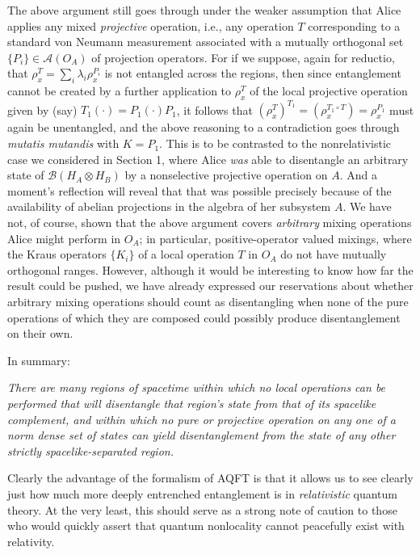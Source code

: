 \documentclass[12pt]{article}
\newcommand{\alg}[1]{\mbox{$\mathcal{#1}$}}
\begin{document}
       The above argument still goes through under the weaker assumption that 
       Alice applies any mixed \emph{projective} operation, i.e., any 
       operation $T$ corresponding to a standard von Neumann 
       measurement associated with a mutually orthogonal set 
       $\{P_{i}\}\in\alg{A}(O_{A})$ of projection operators.  For if we 
        suppose, again for reductio,
        that $\rho_{x}^{T}=\sum_{i}\lambda_{i}\rho_{x}^{P_{i}}$ is 
        not entangled across the regions, then since entanglement 
        cannot be created by a further application to $\rho_{x}^{T}$ of the local projective 
        operation given by (say) $T_{1}(\cdot)=P_{1}(\cdot)P_{1}$, it follows that 
        $(\rho_{x}^{T})^{T_{1}}=(\rho_{x}^{T_{1}\circ T})=\rho_{x}^{P_{1}}$ must again be 
        unentangled, and the above reasoning to a contradiction 
        goes through \emph{mutatis mutandis} with $K=P_{1}$.  This is to be 
        contrasted to the nonrelativistic case we considered in 
        Section 1, where Alice \emph{was} able to disentangle an 
        arbitrary state of $\alg{B}(H_{A}\otimes H_{B})$ by a 
        nonselective projective operation on $A$.  And a moment's reflection 
        will reveal that that was possible precisely because of 
        the availability of abelian projections in the algebra of her 
        subsystem $A$.  
        We have not, of course, shown that the above 
        argument covers \emph{arbitrary} mixing operations Alice 
        might perform in $O_{A}$; in particular, positive-operator 
        valued mixings, where the Kraus 
        operators $\{K_{i}\}$ of a local operation $T$ in $O_{A}$ do not have mutually 
        orthogonal ranges.  However, although it would be interesting to know 
        how far the result could be pushed, we have already expressed our 
        reservations about whether arbitrary mixing operations should count 
        as disentangling when none of the pure operations of which they are 
        composed could possibly produce disentanglement on their own.   
        
                    In summary:
                    \begin{center} \emph{There are many 
                    regions of spacetime within which no local operations can be 
               performed that will disentangle that region's state from that of 
               its spacelike complement, and within which no pure or 
               projective 
               operation on any one of a norm dense set of states can 
               yield 
               disentanglement from the state of any other 
               strictly spacelike-separated region.}\end{center}
\noindent 
Clearly the advantage of 
               the formalism of AQFT is 
               that it allows us to see clearly just how much more 
               deeply entrenched entanglement is in 
               \emph{relativistic} quantum theory.  At the very least, this should 
               serve as a strong note of caution to those who would quickly 
               assert that quantum nonlocality cannot peacefully 
               exist with relativity. 
               
\end{document}
